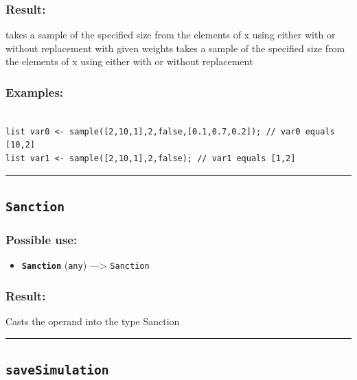 \documentclass[]{book}
\providecommand{\tightlist}{%
  \setlength{\itemsep}{0pt}\setlength{\parskip}{0pt}}
\theoremstyle{definition}
\theoremstyle{definition}
\theoremstyle{definition}
\theoremstyle{remark}
\begin{document}
\subsubsection{Result:}\label{result-434}

takes a sample of the specified size from the elements of x using either
with or without replacement with given weights takes a sample of the
specified size from the elements of x using either with or without
replacement

\subsubsection{Examples:}\label{examples-309}

\begin{verbatim}
 
list var0 <- sample([2,10,1],2,false,[0.1,0.7,0.2]); // var0 equals [10,2] 
list var1 <- sample([2,10,1],2,false); // var1 equals [1,2]
\end{verbatim}

\begin{center}\rule{0.5\linewidth}{\linethickness}\end{center}

\subsection{\texorpdfstring{\texttt{Sanction}}{Sanction}}\label{sanction}

\subsubsection{Possible use:}\label{possible-use-449}

\begin{itemize}
\tightlist
\item
  \textbf{\texttt{Sanction}} (\texttt{any}) ---\textgreater{}
  \texttt{Sanction}
\end{itemize}

\subsubsection{Result:}\label{result-435}

Casts the operand into the type Sanction

\begin{center}\rule{0.5\linewidth}{\linethickness}\end{center}

\subsection{\texorpdfstring{\texttt{saveSimulation}}{saveSimulation}}\label{savesimulation}
\end{document}
